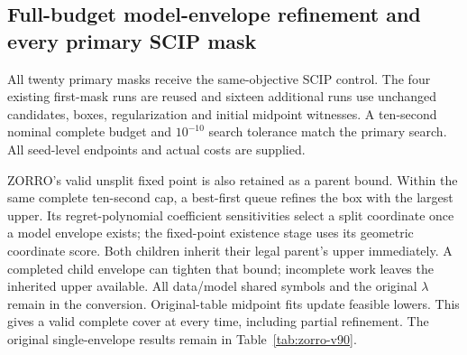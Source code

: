 \subsection{Full-budget model-envelope refinement and every primary SCIP mask}\label{app:refined-external-v91}
All twenty primary masks receive the same-objective SCIP control. The four existing first-mask runs are reused and sixteen additional runs use unchanged candidates, boxes, regularization and initial midpoint witnesses. A ten-second nominal complete budget and $10^{-10}$ search tolerance match the primary search. All seed-level endpoints and actual costs are supplied.

ZORRO's valid unsplit fixed point is also retained as a parent bound. Within the same complete ten-second cap, a best-first queue refines the box with the largest upper. Its regret-polynomial coefficient sensitivities select a split coordinate once a model envelope exists; the fixed-point existence stage uses its geometric coordinate score. Both children inherit their legal parent's upper immediately. A completed child envelope can tighten that bound; incomplete work leaves the inherited upper available. All data/model shared symbols and the original $\lambda$ remain in the conversion. Original-table midpoint fits update feasible lowers. This gives a valid complete cover at every time, including partial refinement. The original single-envelope results remain in Table~\ref{tab:zorro-v90}.

